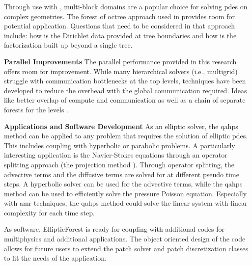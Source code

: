 Through use with \pforest, multi-block domains are a popular choice for solving \gls{pdes} on complex geometries. The forest of octree approach used in \pforest provides room for potential application. Questions that need to be considered in that approach include: how is the Dirichlet data provided at tree boundaries and how is the factorization built up beyond a single tree.

{\bf Parallel Improvements}
The parallel performance provided in this research offers room for improvement. While many hierarchical solvers (i.e., multigrid) struggle with communication bottlenecks at the top levels, techniques have been developed to reduce the overhead with the global communication required. Ideas like better overlap of compute and communication as well as a chain of separate forests for the levels \citep{bangerth2012algorithms}.

{\bf Applications and Software Development}
As an elliptic solver, the \gls{qahps} method can be applied to any problem that requires the solution of elliptic \gls{pdes}. This includes coupling with hyperbolic or parabolic problems. A particularly interesting application is the Navier-Stokes equations through an operator splitting approach (the projection method \citep{chorin1967numerical}). Through operator splitting, the advective terms and the diffusive terms are solved for at different pseudo time steps. A hyperbolic solver can be used for the advective terms, while the \gls{qahps} method can be used to efficiently solve the pressure Poisson equation. Especially with \gls{amr} techniques, the \gls{qahps} method could solve the linear system with linear complexity for each time step.

As software, EllipticForest \citep{chipman2024ellipticforest} is ready for coupling with additional codes for multiphysics and additional applications. The object oriented design of the code allows for future users to extend the patch solver and patch discretization classes to fit the needs of the application.